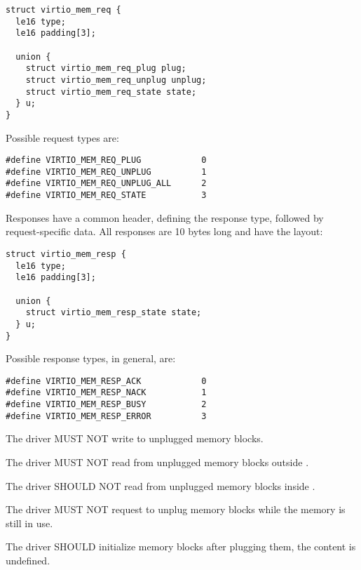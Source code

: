 \begin{lstlisting}
struct virtio_mem_req {
  le16 type;
  le16 padding[3];

  union {
    struct virtio_mem_req_plug plug;
    struct virtio_mem_req_unplug unplug;
    struct virtio_mem_req_state state;
  } u;
}
\end{lstlisting}

Possible request types are:

\begin{lstlisting}
#define VIRTIO_MEM_REQ_PLUG            0
#define VIRTIO_MEM_REQ_UNPLUG          1
#define VIRTIO_MEM_REQ_UNPLUG_ALL      2
#define VIRTIO_MEM_REQ_STATE           3
\end{lstlisting}

Responses have a common header, defining the response type, followed by
request-specific data.  All responses are 10 bytes long and have the layout:

\begin{lstlisting}
struct virtio_mem_resp {
  le16 type;
  le16 padding[3];

  union {
    struct virtio_mem_resp_state state;
  } u;
}
\end{lstlisting}

Possible response types, in general, are:

\begin{lstlisting}
#define VIRTIO_MEM_RESP_ACK            0
#define VIRTIO_MEM_RESP_NACK           1
#define VIRTIO_MEM_RESP_BUSY           2
#define VIRTIO_MEM_RESP_ERROR          3
\end{lstlisting}


The driver MUST NOT write to unplugged memory blocks.

The driver MUST NOT read from unplugged memory blocks outside
.

The driver SHOULD NOT read from unplugged memory blocks inside
.

The driver MUST NOT request to unplug memory blocks while the memory is
still in use.

The driver SHOULD initialize memory blocks after plugging them, the content
is undefined.

